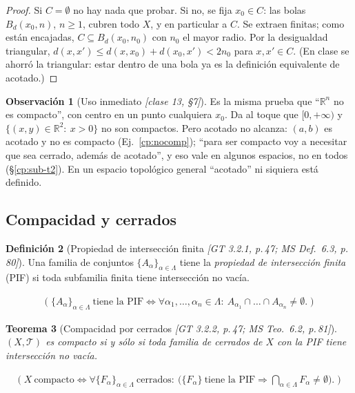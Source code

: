 \documentclass[11pt,a4paper]{article}
\newcommand{\lgc}[1]{\par\vspace{-3pt}\begin{gather*}\big(\;#1\;\big)\end{gather*}\vspace{-6pt}}
\theoremstyle{definition}
\newtheorem{definicion}{Definición}[section]
\newtheorem{observacion}[definicion]{Observación}
\theoremstyle{plain}
\newtheorem{teorema}[definicion]{Teorema}
\newcommand{\fnt}[1]{{\normalfont\small\itshape\color{gray!150!black}[#1]}}
\newcommand{\R}{\mathbb{R}}
\newcommand{\Bola}[2]{B_d(#1,#2)}
\newcommand{\tp}{\mathcal{T}}
\begin{document}
\begin{proof}
Si $C=\emptyset$ no hay nada que probar. Si no, se fija $x_0\in C$: las bolas $\Bola{x_0}{n}$, $n\ge1$, cubren todo $X$, y en particular a $C$. Se extraen finitas; como están encajadas, $C\subseteq\Bola{x_0}{n_0}$ con $n_0$ el mayor radio. Por la desigualdad triangular, $d(x,x')\le d(x,x_0)+d(x_0,x')<2n_0$ para $x,x'\in C$. (En clase se ahorró la triangular: estar dentro de una bola ya es la definición equivalente de acotado.)
\end{proof}

\begin{observacion}[Uso inmediato \fnt{clase 13, \S7}]
Es la misma prueba que ``$\R^n$ no es compacto'', con centro en un punto cualquiera $x_0$. Da al toque que $[0,+\infty)$ y $\{(x,y)\in\R^2:\ x>0\}$ no son compactos. Pero acotado no alcanza: $(a,b)$ es acotado y no es compacto (Ej.~\ref{cp:nocomp}); ``para ser compacto voy a necesitar que sea cerrado, además de acotado'', y eso vale en algunos espacios, no en todos (\S\ref{cp:sub-t2}). En un espacio topológico general ``acotado'' ni siquiera está definido.
\end{observacion}

\subsection[Compacidad y cerrados]{Compacidad y cerrados}\label{cp:sub-cerr}

\begin{definicion}[Propiedad de intersección finita \fnt{GT 3.2.1, p.\,47; MS Def.\ 6.3, p.\,80}]
Una familia de conjuntos $\{A_\alpha\}_{\alpha\in\Lambda}$ tiene la \emph{propiedad de intersección finita} (PIF) si toda subfamilia finita tiene intersección no vacía.
\lgc{\{A_\alpha\}_{\alpha\in\Lambda}\ \text{tiene la PIF}\iff \forall\alpha_1,\dots,\alpha_n\in\Lambda:\ A_{\alpha_1}\cap\dots\cap A_{\alpha_n}\ne\emptyset.}
\end{definicion}

\begin{teorema}[Compacidad por cerrados \fnt{GT 3.2.2, p.\,47; MS Teo.\ 6.2, p.\,81}]\label{cp:pif}
$(X,\tp)$ es compacto si y sólo si toda familia de cerrados de $X$ con la PIF tiene intersección no vacía.
\lgc{X\ \text{compacto}\iff \forall\{F_\alpha\}_{\alpha\in\Lambda}\ \text{cerrados}:\ \big(\{F_\alpha\}\ \text{tiene la PIF}\Rightarrow \textstyle\bigcap_{\alpha\in\Lambda}F_\alpha\ne\emptyset\big).}
\end{teorema}
\end{document}
